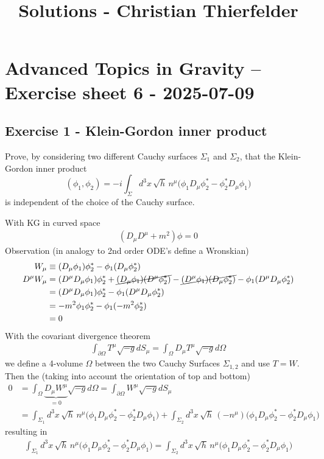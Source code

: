 \documentclass[10pt,a4paper]{article}
\title{Solutions - Christian Thierfelder}
\theoremstyle{definition}
\begin{document}
\maketitle
\section*{Advanced Topics in Gravity – Exercise sheet 6 - 2025-07-09}
\subsection*{Exercise 1 - Klein-Gordon inner product}
{\color{blue}

Prove, by considering two different Cauchy surfaces $\Sigma_1$ and $\Sigma_2$, that the Klein-Gordon inner product
\begin{equation}
(\phi_1, \phi_2) = -i \int_{\Sigma} d^3x \, \sqrt{h} \, n^{\mu} \bigl( \phi_1 D_{\mu} \phi_2^* - \phi_2^* D_{\mu} \phi_1 \bigr)
\end{equation}
is independent of the choice of the Cauchy surface.
}

With KG in curved space
\begin{align}
(D_\mu D^\mu+m^2)\phi=0
\end{align}
Observation (in analogy to 2nd order ODE's define a Wronskian)
\begin{align}
W_\mu&\equiv(D_\mu\phi_1)\phi_2^*-\phi_1(D_\mu\phi_2^*)\\
D^\mu W_\mu
&=(D^\mu D_\mu\phi_1)\phi_2^*+\cancel{(D_\mu\phi_1)(D^\mu\phi_2^*)}-\cancel{(D^\mu\phi_1)(D_\mu\phi_2^*)}-\phi_1(D^\mu D_\mu\phi_2^*)\\
&=(D^\mu D_\mu\phi_1)\phi_2^*-\phi_1(D^\mu D_\mu\phi_2^*)\\
&=-m^2\phi_1\phi_2^*-\phi_1(-m^2\phi_2^*)\\
&=0
\end{align}
With the covariant divergence theorem
\begin{align}
\int_{\partial\Omega} T^\mu\sqrt{-g}dS_\mu=\int_\Omega D_\mu T^\mu\sqrt{-g}d\Omega
\end{align}
we define a 4-volume $\Omega$ between the two Cauchy Surfaces $\Sigma_{1,2}$ and use $T=W$.  Then the (taking into account the orientation of top and bottom)
\begin{align}
0&=
\int_\Omega \underbrace{D_\mu W^\mu}_{=0}\sqrt{-g}d\Omega
=\int_{\partial\Omega} W^\mu\sqrt{-g}dS_\mu\\
&=
\int_{\Sigma_1} d^3x \, \sqrt{h} \, n^{\mu} \bigl( \phi_1 D_{\mu} \phi_2^* - \phi_2^* D_{\mu} \phi_1 \bigr)+\int_{\Sigma_2} d^3x \, \sqrt{h} \, (-n^{\mu}) \bigl( \phi_1 D_{\mu} \phi_2^* - \phi_2^* D_{\mu} \phi_1 \bigr)
\end{align}
resulting in
\begin{align}
\int_{\Sigma_1} d^3x \, \sqrt{h} \, n^{\mu} \bigl( \phi_1 D_{\mu} \phi_2^* - \phi_2^* D_{\mu} \phi_1 \bigr)=\int_{\Sigma_2} d^3x \, \sqrt{h} \, n^{\mu} \bigl( \phi_1 D_{\mu} \phi_2^* - \phi_2^* D_{\mu} \phi_1 \bigr)
\end{align}
\end{document}
